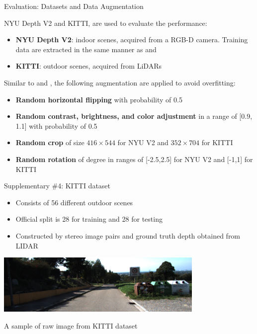 \documentclass[10pt]{beamer}
\begin{document}
\begin{frame}{Evaluation: Datasets and Data Augmentation}

    NYU Depth V2 and KITTI, are used to evaluate the performance:
    \begin{itemize}
        \item \textbf{NYU Depth V2}: indoor scenes, acquired from a RGB-D camera. Training data are extracted in the same manner as \cite{bts} and \cite{adabins}
        \item \textbf{KITTI}: outdoor scenes, acquired from LiDARs
    \end{itemize}
    
    \vspace{0.3cm} 
    
    Similar to \cite{bts} and \cite{adabins}, the following augmentation are applied to avoid overfitting:
    \begin{itemize}
        \item \textbf{Random horizontal flipping} with probability of 0.5
        \item \textbf{Random contrast, brightness, and color adjustment} in a range of [0.9, 1.1] with probability of 0.5
        \item \textbf{Random crop} of size $416\times544$ for NYU V2 and $352\times704$ for KITTI
        \item \textbf{Random rotation} of degree in ranges of [-2.5,2.5] for NYU V2 and [-1,1] for KITTI
    \end{itemize}
\end{frame}

\begin{frame}{Supplementary \#4: KITTI dataset}
\begin{itemize}
    \item Consists of 56 different outdoor scenes
    \item Official split is 28 for training and 28 for testing
    \item Constructed by stereo image pairs and ground truth depth obtained from LIDAR
\end{itemize}

\smallskip
\centering
\includegraphics[width=10cm]{kitti_sample.png}\par
A sample of raw image from KITTI dataset

\end{frame}
\end{document}
